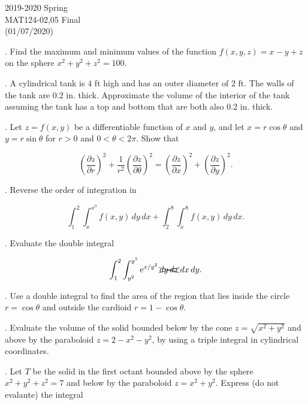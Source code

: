 \documentclass{article}
\begin{document}
\pagestyle{empty}
\large

\begin{center}
2019-2020 Spring \\MAT124-02,05 Final\\(01/07/2020)
\end{center}

. Find the maximum and minimum values of the function $f(x,y,z)=x-y+z$ on the sphere $x^2+y^2+z^2=100$.

\hfill

. A cylindrical tank is $4$ ft high and has an outer diameter of $2$ ft. The walls of the tank are $0.2$ in. thick. Approximate the volume of the interior of the tank assuming the tank has a top and bottom that are both also $0.2$ in. thick.

\hfill

. Let $z=f(x,y)$ be a differentiable function of $x$ and $y$, and let $x=r\cos\theta$ and $y=r\sin\theta$ for $r>0$ and $0<\theta<2\pi$. Show that

\[\left(\frac{\partial z}{\partial r}\right)^2+\frac1{r^2}\left(\frac{\partial z}{\partial\theta}\right)^2=\left(\frac{\partial z}{\partial x}\right)^2+\left(\frac{\partial z}{\partial y}\right)^2.\]

\hfill

. Reverse the order of integration in

\[\displaystyle\int_1^2\int_x^{x^3}f(x,y)\,dy\,dx+\int_2^8\int_x^8f(x,y)\,dy\,dx.\]

\hfill

. Evaluate the double integral

\[\int_1^2\int_{y^2}^{y^5}\mathrm{e}^{x/y^2}\,\xcancel{dy\,dx}\,dx\,dy.\]

\hfill

. Use a double integral to find the area of the region that lies inside the circle $r=\cos\theta$ and outside the cardioid $r=1-\cos\theta$.

\hfill

. Evaluate the volume of the solid bounded below by the cone $z=\sqrt{x^2+y^2}$ and above by the paraboloid $z=2-x^2-y^2$, by using a triple integral in cylindrical coordinates.

\hfill

. Let $T$ be the solid in the first octant bounded above by the sphere $x^2+y^2+z^2=7$ and below by the paraboloid $z=x^2+y^2$. Express (do not evalaute) the integral
\end{document}
